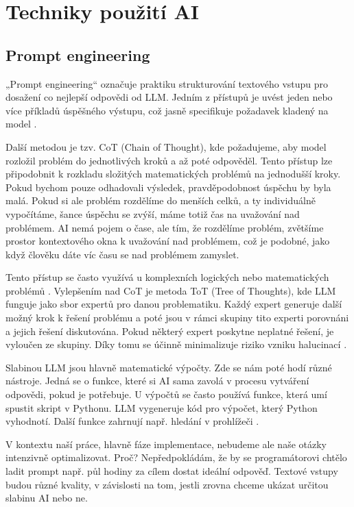 \documentclass[FM,DP]{tulthesis}
\begin{document}
		\section{Techniky použití AI} 
		\subsection{Prompt engineering}
		„Prompt engineering“ označuje praktiku strukturování textového vstupu pro dosažení co nejlepší odpovědi od LLM. Jedním z přístupů je uvést jeden nebo více příkladů úspěšného výstupu, což jasně specifikuje požadavek kladený na model \cite{PEG}.
		
		Další metodou je tzv. CoT (Chain of Thought), kde požadujeme, aby model rozložil problém do jednotlivých kroků a až poté odpověděl. Tento přístup lze připodobnit k rozkladu složitých matematických problémů na jednodušší kroky. Pokud bychom pouze odhadovali výsledek, pravděpodobnost úspěchu by byla malá. Pokud si ale problém rozdělíme do menších celků, a ty individuálně vypočítáme, šance úspěchu se zvýší, máme totiž čas na uvažování nad problémem. AI nemá pojem o čase, ale tím, že rozdělíme problém, zvětšíme prostor kontextového okna k uvažování nad problémem, což je podobné, jako když člověku dáte víc času se nad problémem zamyslet. 
		
		Tento přístup se často využívá u komplexních logických nebo matematických problémů \cite{PEG}. Vylepšením nad CoT je metoda ToT (Tree of Thoughts), kde LLM funguje jako sbor expertů pro danou problematiku. Každý expert generuje další možný krok k řešení problému a poté jsou v rámci skupiny tito experti porovnáni a jejich řešení diskutována. Pokud některý expert poskytne neplatné řešení, je vyloučen ze skupiny. Díky tomu se účinně minimalizuje riziko vzniku halucinací \cite{PEG}.
		
		Slabinou LLM jsou hlavně matematické výpočty. Zde se nám poté hodí různé nástroje. Jedná se o funkce, které si AI sama zavolá v procesu vytváření odpovědi, pokud je potřebuje. U výpočtů se často používá funkce, která umí spustit skript v Pythonu. LLM vygeneruje kód pro výpočet, který Python vyhodnotí. Další funkce zahrnují např. hledání v prohlížeči \cite{PEG}.
		
		V kontextu naší práce, hlavně fáze implementace, nebudeme ale naše otázky intenzivně optimalizovat. Proč? Nepředpokládám, že by se programátorovi chtělo ladit prompt např. půl hodiny za cílem dostat ideální odpověď. Textové vstupy budou různé kvality, v závislosti na tom, jestli zrovna chceme ukázat určitou slabinu AI nebo ne. 
		
\end{document}
